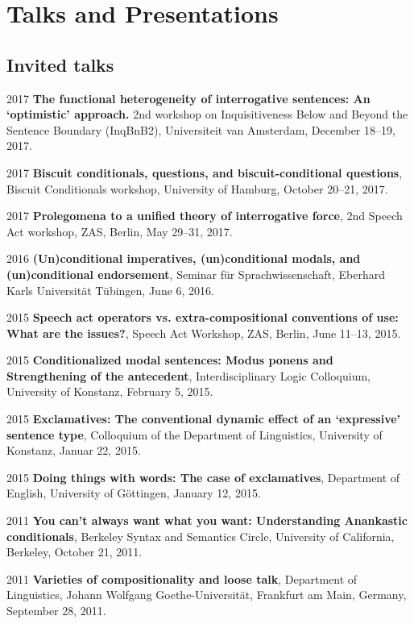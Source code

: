 \section*{\sc Talks and Presentations}
\subsection*{Invited talks}
\begin{dated}
	\item[2017]
		\textbf{The functional heterogeneity of interrogative sentences: An `optimistic' approach.}
		2nd workshop on Inquisitiveness Below and Beyond the Sentence Boundary (InqBnB2), 
		Universiteit van Amsterdam,
		December 18--19, 2017.
	\item[2017]
		\textbf{Biscuit conditionals, questions, and biscuit-conditional
questions}, 
		Biscuit Conditionals workshop, 
		University of Hamburg, 
		October 20--21, 2017.
	\item[2017]
		\textbf{Prolegomena to a unified theory of interrogative force}, 
		2nd Speech Act workshop, 
		ZAS, Berlin,
		May 29--31, 2017.
	\item[2016]
		\textbf{(Un)conditional imperatives, (un)conditional modals, and (un)conditional endorsement}, 
		Seminar f\"ur Sprachwissenschaft, 
		Eberhard Karls Universit\"at T\"ubingen, 
		June 6, 2016.
	\item[2015]
		\textbf{Speech act operators vs. extra-compositional conventions of use: What are the issues?}, 
		Speech Act Workshop, 
		ZAS, Berlin, 
		June 11--13, 2015.
	\item[2015]
		\textbf{Conditionalized modal sentences: Modus ponens and Strengthening of the antecedent}, 
		Interdisciplinary Logic Colloquium, 
		University of Konstanz, 
		February 5, 2015.
	\item[2015]
		\textbf{Exclamatives: The conventional dynamic effect of an `expressive' sentence type},
		Colloquium of the Department of Linguistics, 
		University of Konstanz, 
		Januar 22, 2015.
	\item[2015]
		\textbf{Doing things with words: The case of exclamatives}, 
		Department of English, 
		University of G\"ottingen, 
		January 12, 2015.
	\item[2011]
		\textbf{You can't always want what you want: Understanding Anankastic conditionals}, 
		Berkeley Syntax and Semantics Circle, 
		University of California, Berkeley, 
		October 21, 2011.
	\item[2011]
		\textbf{Varieties of compositionality and loose talk}, 
		Department of Linguistics, 
		Johann Wolfgang Goethe-Universit\"at, 
		Frankfurt am Main, Germany, 
		September 28, 2011.
\end{dated}
